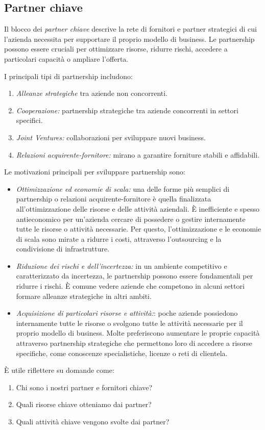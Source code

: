 \subsection*{Partner chiave}
Il blocco dei \textit{partner chiave} descrive la rete di fornitori e partner strategici di cui l’azienda necessita per supportare il proprio modello di business. Le partnership possono essere cruciali per ottimizzare risorse, ridurre rischi, accedere a particolari capacità o ampliare l’offerta.

I principali tipi di partnership includono:
\begin{enumerate}
    \item \textit{Alleanze strategiche} tra aziende non concorrenti.
    \item \textit{Cooperazione:} partnership strategiche tra aziende concorrenti in settori specifici.
    \item \textit{Joint Ventures:} collaborazioni per sviluppare nuovi business.
    \item \textit{Relazioni acquirente-fornitore:} mirano a garantire forniture stabili e affidabili.
\end{enumerate}
Le motivazioni principali per sviluppare partnership sono:
\begin{itemize}
    \item \textit{Ottimizzazione ed economie di scala:} una delle forme più semplici di partnership o relazioni acquirente-fornitore è quella finalizzata all’ottimizzazione delle risorse e delle attività aziendali. È inefficiente e spesso antieconomico per un’azienda cercare di possedere o gestire internamente tutte le risorse o attività necessarie. Per questo, l’ottimizzazione e le economie di scala sono mirate a ridurre i costi, attraverso l’outsourcing e la condivisione di infrastrutture.
    \item \textit{Riduzione dei rischi e dell’incertezza:} in un ambiente competitivo e caratterizzato da incertezza, le partnership possono essere fondamentali per ridurre i rischi. È comune vedere aziende che competono in alcuni settori formare alleanze strategiche in altri ambiti.
    \item \textit{Acquisizione di particolari risorse e attività:}: poche aziende possiedono internamente tutte le risorse o svolgono tutte le attività necessarie per il proprio modello di business. Molte preferiscono aumentare le proprie capacità attraverso partnership strategiche che permettono loro di accedere a risorse specifiche, come conoscenze specialistiche, licenze o reti di clientela.
\end{itemize}
È utile riflettere su domande come:
\begin{enumerate}
    \item Chi sono i nostri partner e fornitori chiave?
    \item Quali risorse chiave otteniamo dai partner?
    \item Quali attività chiave vengono svolte dai partner?
\end{enumerate}

